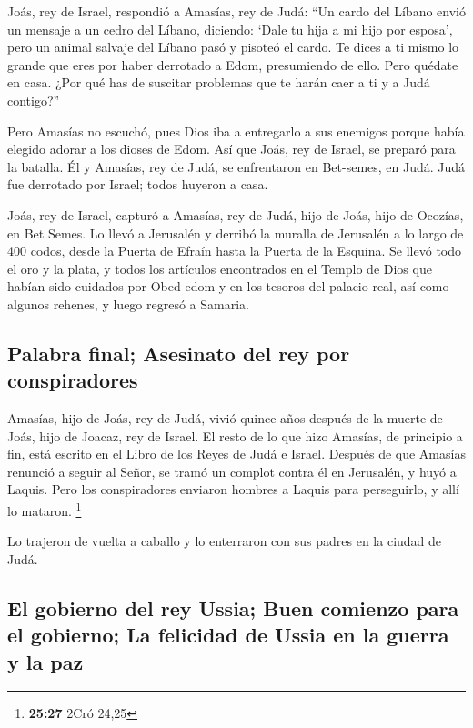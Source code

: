  Joás, rey de Israel, respondió a Amasías, rey de Judá:
``Un cardo del Líbano envió un mensaje a un cedro del Líbano, diciendo:
`Dale tu hija a mi hijo por esposa', pero un animal salvaje del Líbano
pasó y pisoteó el cardo.  Te dices a ti mismo lo grande
que eres por haber derrotado a Edom, presumiendo de ello. Pero quédate
en casa. ¿Por qué has de suscitar problemas que te harán caer a ti y a
Judá contigo?''

 Pero Amasías no escuchó, pues Dios iba a entregarlo a
sus enemigos porque había elegido adorar a los dioses de Edom.
 Así que Joás, rey de Israel, se preparó para la batalla.
Él y Amasías, rey de Judá, se enfrentaron en Bet-semes, en Judá.
 Judá fue derrotado por Israel; todos huyeron a casa.

 Joás, rey de Israel, capturó a Amasías, rey de Judá,
hijo de Joás, hijo de Ocozías, en Bet Semes. Lo llevó a Jerusalén y
derribó la muralla de Jerusalén a lo largo de 400 codos, desde la Puerta
de Efraín hasta la Puerta de la Esquina.  Se llevó todo
el oro y la plata, y todos los artículos encontrados en el Templo de
Dios que habían sido cuidados por Obed-edom y en los tesoros del palacio
real, así como algunos rehenes, y luego regresó a Samaria.

\hypertarget{palabra-final-asesinato-del-rey-por-conspiradores}{%
\subsection{Palabra final; Asesinato del rey por
conspiradores}\label{palabra-final-asesinato-del-rey-por-conspiradores}}

 Amasías, hijo de Joás, rey de Judá, vivió quince años
después de la muerte de Joás, hijo de Joacaz, rey de Israel.
 El resto de lo que hizo Amasías, de principio a fin,
está escrito en el Libro de los Reyes de Judá e Israel. 
Después de que Amasías renunció a seguir al Señor, se tramó un complot
contra él en Jerusalén, y huyó a Laquis. Pero los conspiradores enviaron
hombres a Laquis para perseguirlo, y allí lo mataron. \footnote{\textbf{25:27}
  2Cró 24,25}

 Lo trajeron de vuelta a caballo y lo enterraron con sus
padres en la ciudad de Judá.

\hypertarget{el-gobierno-del-rey-ussia-buen-comienzo-para-el-gobierno-la-felicidad-de-ussia-en-la-guerra-y-la-paz}{%
\subsection{El gobierno del rey Ussia; Buen comienzo para el gobierno;
La felicidad de Ussia en la guerra y la
paz}\label{el-gobierno-del-rey-ussia-buen-comienzo-para-el-gobierno-la-felicidad-de-ussia-en-la-guerra-y-la-paz}}

